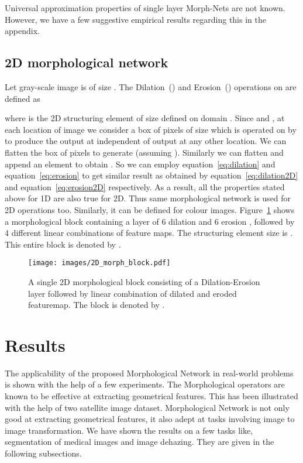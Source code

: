 \documentclass[12pt]{article}
\def\eqref#1{equation~\ref{#1}}
\begin{document}
Universal approximation properties of single layer Morph-Nets are not known. However, we have a few suggestive empirical results regarding this in the appendix.

\subsection{2D morphological network }

Let gray-scale image  is of size . The Dilation~() and Erosion~() operations on   are defined as~\cite{sternberg1986grayscale} 
{\small 
 
}
where   is the 2D structuring element of size  defined on domain . Since  and , at each location  of image  we consider a box of pixels of size  which is operated on by  to produce the output at  independent of output at any other location. We can flatten the box of pixels to generate  (assuming ). Similarly we can flatten  and append an element to obtain . So we can employ \eqref{eq:dilation} and \eqref{eq:erosion} to get similar result as obtained by \eqref{eq:dilation2D} and \eqref{eq:erosion2D} respectively. As a result, all the properties stated above for 1D are also true for 2D. Thus same morphological network is used for 2D operations too. Similarly, it can be defined for colour images. Figure~\ref{fig:2dd1e1_lc} shows a morphological block containing a layer of 6 dilation and 6 erosion , followed by 4 different linear combinations of feature maps. The structuring element size is . This entire block is denoted by .


\begin{figure}
    \centering
    \texttt{[image: images/2D\_morph\_block.pdf]}
    \caption{A single 2D morphological  block consisting of a Dilation-Erosion layer  followed by linear combination of dilated and eroded featuremap. The block is denoted by  .}
    \label{fig:2dd1e1_lc}
\end{figure} 

\section{Results}
\label{sec:results}
The applicability of the proposed Morphological Network in real-world problems is shown with the help of a few experiments. The Morphological operators are known to be effective at extracting geometrical features. This has been illustrated with the help of two satellite image dataset. Morphological Network is not only good at extracting geometrical features, it also adept at tasks involving image to image transformation. We have shown the results on a few tasks like, segmentation of medical images and image dehazing. They are given in the following subsections.
\end{document}

